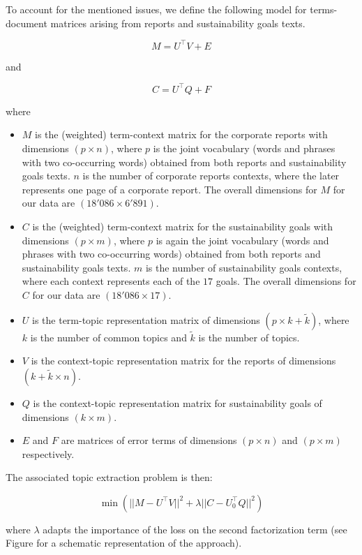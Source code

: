 \documentclass[
]{article}
\providecommand{\tightlist}{%
  \setlength{\itemsep}{0pt}\setlength{\parskip}{0pt}}
\begin{document}
To account for the mentioned issues, we define the following model for terms-document matrices arising from reports and sustainability goals texts.

\[M = U^\top V + E\]

and

\[C = U^\top Q + F\]

where

\begin{itemize}
\tightlist
\item
  \(M\) is the (weighted) term-context matrix for the corporate reports with dimensions \((p\times n)\), where \(p\) is the joint vocabulary (words and phrases with two co-occurring words) obtained from both reports and sustainability goals texts. \(n\) is the number of corporate reports contexts, where the later represents one page of a corporate report. The overall dimensions for \(M\) for our data are \((18'086\times 6'891)\).
\item
  \(C\) is the (weighted) term-context matrix for the sustainability goals with dimensions \((p\times m)\), where \(p\) is again the joint vocabulary (words and phrases with two co-occurring words) obtained from both reports and sustainability goals texts. \(m\) is the number of sustainability goals contexts, where each context represents each of the \(17\) goals. The overall dimensions for \(C\) for our data are \((18'086\times 17)\).
\item
  \(U\) is the term-topic representation matrix of dimensions \((p\times k+\tilde k)\), where \(k\) is the number of common topics and \(\tilde k\) is the number of topics.
\item
  \(V\) is the context-topic representation matrix for the reports of dimensions \((k+\tilde k\times n)\).
\item
  \(Q\) is the context-topic representation matrix for sustainability goals of dimensions \((k\times m)\).
\item
  \(E\) and \(F\) are matrices of error terms of dimensions \((p\times n)\) and \((p\times m)\) respectively.
\end{itemize}

The associated topic extraction problem is then:

\begin{equation}\min(||M - U^\top V||^2 + \lambda ||C-U_0^\top Q||^2)\label{eq:minc}
\end{equation}

where \(\lambda\) adapts the importance of the loss on the second factorization term (see Figure for a schematic representation of the approach).
\end{document}
